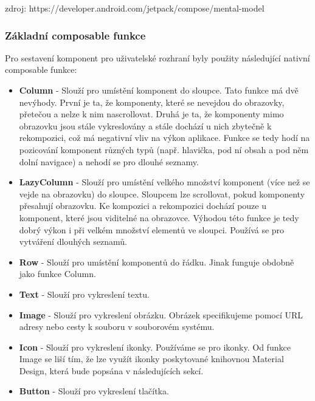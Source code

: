 \noindent zdroj:
https://developer.android.com/jetpack/compose/mental-model

\subsubsection*{Základní composable funkce}

\noindent Pro sestavení komponent pro uživatelské rozhraní byly použity následující nativní composable funkce:

\begin{itemize}
	\item \textbf{Column} - Slouží pro umístění  komponent do sloupce. Tato funkce má dvě nevýhody. První je ta, že komponenty, které se nevejdou do obrazovky, přetečou a nelze k nim nascrollovat. Druhá je ta, že komponenty mimo obrazovku jsou stále vykreslovány a stále dochází u nich zbytečně k rekompozici, což má negativní vliv na výkon aplikace. Funkce se tedy hodí na pozicování komponent různých typů (např. hlavička, pod ní obsah a pod něm dolní navigace) a nehodí se pro dlouhé seznamy.

	\item \textbf{LazyColumn} - Slouží pro umístění velkého množství komponent (více než se vejde na obrazovku) do sloupce. Sloupcem lze scrollovat, pokud komponenty přesahují obrazovku. Ke kompozici a rekompozici dochází pouze u komponent, které jsou viditelné na obrazovce. Výhodou této funkce je tedy dobrý výkon i při velkém množství elementů ve sloupci. Používá se pro vytváření dlouhých seznamů.

	\item \textbf{Row} - Slouží pro umístění komponentů do řádku. Jinak funguje obdobně jako funkce Column.

	\item \textbf{Text} - Slouží pro vykreslení textu.

	\item \textbf{Image} - Slouží pro vykreslení obrázku. Obrázek specifikujeme pomocí URL adresy nebo cesty k souboru v souborovém systému.
	
	\item \textbf{Icon} - Slouží pro vykreslení ikonky. Používáme se pro ikonky. Od funkce Image se liší tím, že lze využít ikonky poskytované knihovnou Material Design, která bude popsána v následujících sekcí.

	\item \textbf{Button} - Slouží pro vykreslení tlačítka. 
\end{itemize}

